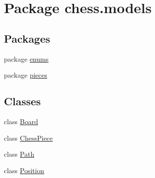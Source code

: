 \hypertarget{namespacechess_1_1models}{}\section{Package chess.\+models}
\label{namespacechess_1_1models}
\subsection*{Packages}
\begin{DoxyCompactItemize}
\item 
package \mbox{\hyperlink{namespacechess_1_1models_1_1enums}{enums}}
\item 
package \mbox{\hyperlink{namespacechess_1_1models_1_1pieces}{pieces}}
\end{DoxyCompactItemize}
\subsection*{Classes}
\begin{DoxyCompactItemize}
\item 
class \mbox{\hyperlink{classchess_1_1models_1_1_board}{Board}}
\item 
class \mbox{\hyperlink{classchess_1_1models_1_1_chess_piece}{Chess\+Piece}}
\item 
class \mbox{\hyperlink{classchess_1_1models_1_1_path}{Path}}
\item 
class \mbox{\hyperlink{classchess_1_1models_1_1_position}{Position}}
\end{DoxyCompactItemize}
